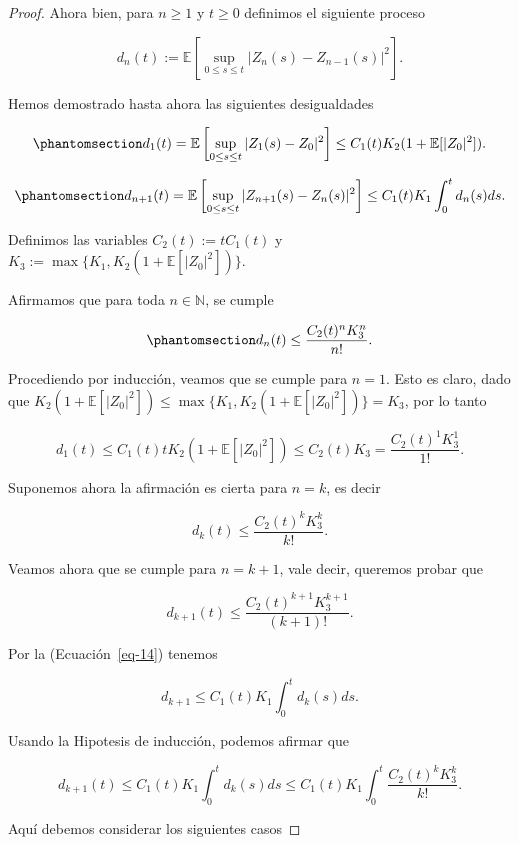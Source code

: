 \documentclass[
  spanish,
  us-letterpaper,
]{scrreprt}
\theoremstyle{plain}
\theoremstyle{plain}
\theoremstyle{definition}
\theoremstyle{plain}
\theoremstyle{remark}
\begin{document}
\begin{proof}
Ahora bien, para \(n\geq 1\) y \(t\geq 0\) definimos el siguiente
proceso

\[
    d_n(t):= \mathbb{E}\left[\sup\limits_{0\leq s\leq t}|Z_n(s)-Z_{n-1}(s)|^2\right].
\]

Hemos demostrado hasta ahora las siguientes desigualdades

\begin{equation}\phantomsection\label{eq-13}{
    d_1(t) = \mathbb{E}\left[\sup\limits_{0\leq s\leq t}|Z_1(s)-Z_0|^2\right]\leq C_1(t)K_2(1+\mathbb{E}[|Z_0|^2]).
}\end{equation}

\begin{equation}\phantomsection\label{eq-14}{
    d_{n+1}(t) = \mathbb{E}\left[\sup\limits_{0\leq s\leq t}|Z_{n+1}(s)-Z_n(s)|^2\right]\leq C_1(t)K_1\int_0^t d_n(s)ds.
}\end{equation}

Definimos las variables \(C_2(t):=tC_1(t)\) y
\(K_3:=\max\{K_1,K_2(1+\mathbb{E}[|Z_0|^2])\}.\)

Afirmamos que para toda \(n\in \mathbb{N}\), se cumple

\begin{equation}\phantomsection\label{eq-15}{
    d_n(t)\leq \frac{C_2(t)^n K_3^n}{n!}.
}\end{equation}

Procediendo por inducción, veamos que se cumple para \(n=1\). Esto es
claro, dado que
\(K_2(1+\mathbb{E}[|Z_0|^2])\leq \max\{K_1,K_2(1+\mathbb{E}[|Z_0|^2])\}=K_3\),
por lo tanto

\[
    d_1(t)\leq C_1(t)tK_2(1+\mathbb{E}[|Z_0|^2])\leq C_2(t)K_3 = \frac{C_2(t)^1 K_3^1}{1!}.
\]

Suponemos ahora la afirmación es cierta para \(n=k\), es decir

\[
    d_k(t)\leq \frac{C_2(t)^k K_3^k}{k!}.
\]

Veamos ahora que se cumple para \(n=k+1\), vale decir, queremos probar
que

\[
    d_{k+1}(t)\leq \frac{C_2(t)^{k+1} K_3^{k+1}}{(k+1)!}.
\]

Por la (Ecuación~\ref{eq-14}) tenemos

\[
        d_{k+1} \leq C_1(t)K_1\int_0^t d_k(s)ds.
\]

Usando la Hipotesis de inducción, podemos afirmar que

\[
    d_{k+1}(t) \leq C_1(t)K_1\int_0^t d_k(s)ds\leq C_1(t)K_1\int_0^t \frac{C_2(t)^kK_3^k}{k!}.
\]

Aquí debemos considerar los siguientes casos


\end{proof}
\end{document}
